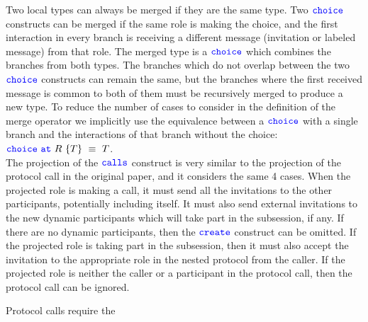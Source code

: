 \documentclass[12pt,twoside]{report}
\begin{document}
Two local types can always be merged if they are the same type. Two ${\color{blue}\mathtt{choice}}$ constructs can be merged if the same role is making the choice, and the first interaction in every branch is receiving a different message (invitation or labeled message) from that role. The merged type is a ${\color{blue}\mathtt{choice}}$ which combines the branches from both types. The branches which do not overlap between the two ${\color{blue}\mathtt{choice}}$ constructs can remain the same, but the branches where the first received message is common to both of them must be recursively merged to produce a new type. To reduce the number of cases to consider in the definition of the merge operator we implicitly use the equivalence between a ${\color{blue}\mathtt{choice}}$ with a single branch and the interactions of that branch without the choice: ${\color{blue}\mathtt{choice}}\ {\color{blue}\mathtt{at}}\ R\ \{T\}\ \equiv\ T$.\\

The projection of the ${\color{blue}\mathtt{calls}}$ construct is very similar to the projection of the protocol call in the original paper\cite{nestedprotocols}, and it considers the same 4 cases. When the projected role is making a call, it must send all the invitations to the other participants, potentially including itself. It must also send external invitations to the new dynamic participants which will take part in the subsession, if any. If there are no dynamic participants, then the ${\color{blue}\mathtt{create}}$ construct can be omitted. If the projected role is taking part in the subsession, then it must also accept the invitation to the appropriate role in the nested protocol from the caller. If the projected role is neither the caller or a participant in the protocol call, then the protocol call can be ignored.



Protocol calls require the 





\end{document}
